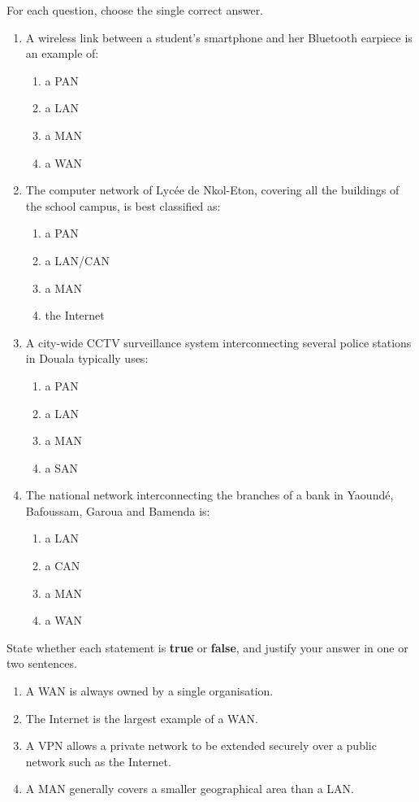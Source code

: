 \documentclass[11pt]{article}
\begin{document}
\begin{exercice}
For each question, choose the single correct answer.
\begin{enumerate}
\item A wireless link between a student's smartphone and her Bluetooth earpiece is an example of:
\begin{enumerate}
\item a PAN \item a LAN \item a MAN \item a WAN
\end{enumerate}
\item The computer network of Lycée de Nkol-Eton, covering all the buildings of the school campus, is best classified as:
\begin{enumerate}
\item a PAN \item a LAN/CAN \item a MAN \item the Internet
\end{enumerate}
\item A city-wide CCTV surveillance system interconnecting several police stations in Douala typically uses:
\begin{enumerate}
\item a PAN \item a LAN \item a MAN \item a SAN
\end{enumerate}
\item The national network interconnecting the branches of a bank in Yaoundé, Bafoussam, Garoua and Bamenda is:
\begin{enumerate}
\item a LAN \item a CAN \item a MAN \item a WAN
\end{enumerate}
\end{enumerate}
\end{exercice}

\begin{exercice}
State whether each statement is \textbf{true} or \textbf{false}, and justify your answer in one or two sentences.
\begin{enumerate}
\item A WAN is always owned by a single organisation.
\item The Internet is the largest example of a WAN.
\item A VPN allows a private network to be extended securely over a public network such as the Internet.
\item A MAN generally covers a smaller geographical area than a LAN.
\end{enumerate}
\end{exercice}
\end{document}
